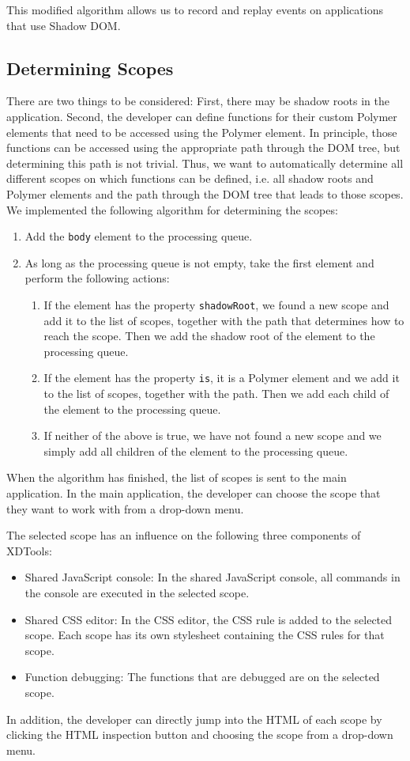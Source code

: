This modified algorithm allows us to record and replay events on applications that use Shadow DOM. 

\subsection{Determining Scopes}

There are two things to be considered: First, there may be shadow roots in the application. Second, the developer can define functions for their custom Polymer elements that need to be accessed using the Polymer element. In principle, those functions can be accessed using the appropriate path through the DOM tree, but determining this path is not trivial. Thus, we want to automatically determine all different scopes on which functions can be defined, i.e. all shadow roots and Polymer elements and the path through the DOM tree that leads to those scopes. We implemented the following algorithm for determining the scopes:
\begin{enumerate}
	\item Add the \lstinline|body| element to the processing queue.
	\item As long as the processing queue is not empty, take the first element and perform the following actions:
	\begin{enumerate}
		\item If the element has the property \lstinline|shadowRoot|, we found a new scope and add it to the list of scopes, together with the path that determines how to reach the scope. Then we add the shadow root of the element to the processing queue.
		\item If the element has the property \lstinline|is|, it is a Polymer element and we add it to the list of scopes, together with the path. Then we add each child of the element to the processing queue.
		\item If neither of the above is true, we have not found a new scope and we simply add all children of the element to the processing queue.
	\end{enumerate}
\end{enumerate}
When the algorithm has finished, the list of scopes is sent to the main application. In the main application, the developer can choose the scope that they want to work with from a drop-down menu.

The selected scope has an influence on the following three components of XDTools:
\begin{itemize}
	\item Shared JavaScript console: In the shared JavaScript console, all commands in the console are executed in the selected scope. 
	\item Shared CSS editor: In the CSS editor, the CSS rule is added to the selected scope. Each scope has its own stylesheet containing the CSS rules for that scope.
	\item Function debugging: The functions that are debugged are on the selected scope.
\end{itemize}
In addition, the developer can directly jump into the HTML of each scope by clicking the HTML inspection button and choosing the scope from a drop-down menu.